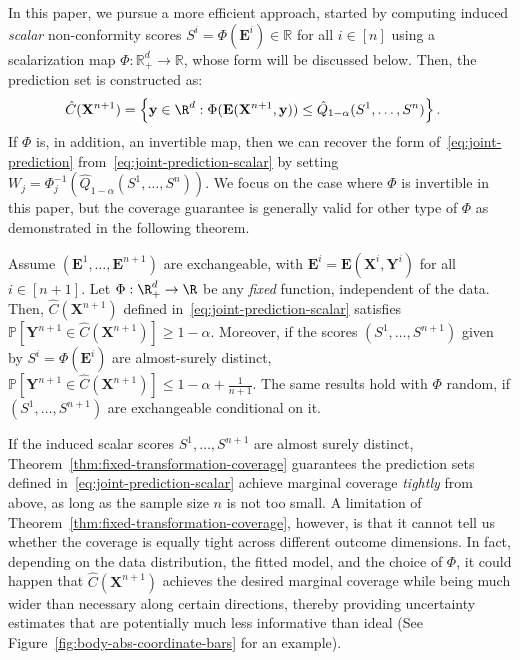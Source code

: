 {\color{blue}In this paper, we pursue a more efficient approach, started by computing induced {\em scalar} non-conformity scores $S^i = \Phi(\mathbf{E}^i) \in \mathbb{R}$ for all $i \in [n]$ using a scalarization map $\Phi : \mathbb{R}^d_+ \to \mathbb{R}$, whose form will be discussed below.
Then, the prediction set is constructed as:
\begin{equation}
    \begin{aligned}
        \hat{C}(\mathbf{X}^{n+1}) &= \left\{\mathbf y \in \R^d: \Phi(\mathbf E(\mathbf{X}^{n+1},\mathbf y)) \leq \hat{Q}_{1-\alpha}(S^1,\ldots,S^n) \right\}.
    \end{aligned}
    \label{eq:joint-prediction-scalar}
\end{equation}
If $\Phi$ is, in addition, an invertible map, then we can recover the form of~\eqref{eq:joint-prediction} from~\eqref{eq:joint-prediction-scalar} by setting $W_j = \Phi^{-1}_j\left(\hat{Q}_{1-\alpha}(S^1,\ldots,S^n)\right)$. We focus on the case where $\Phi$ is invertible in this paper, but the coverage guarantee is generally valid for other type of $\Phi$ as demonstrated in the following theorem.

\begin{theorem} \label{thm:fixed-transformation-coverage}
Assume $(\mathbf{E}^1,\ldots,\mathbf{E}^{n+1})$ are exchangeable, with $\mathbf{E}^i = \mathbf E(\mathbf X^i, \mathbf Y^i)$ for all $i \in [n+1]$.
Let $\Phi:\R^d_+ \to \R$ be any \emph{fixed} function, independent of the data.
Then, $\hat{C}(\mathbf{X}^{n+1})$ defined in~\eqref{eq:joint-prediction-scalar} satisfies $\mathbb{P}[ \mathbf{Y}^{n+1} \in \hat{C}(\mathbf{X}^{n+1}) ] \ge 1 - \alpha$.
Moreover, if the scores $(S^1,\ldots,S^{n+1})$ given by $S^i = \Phi(\mathbf{E}^i)$ are almost-surely distinct, $\mathbb{P}[ \mathbf{Y}^{n+1} \in \hat{C}(\mathbf{X}^{n+1}) ] \leq 1 - \alpha + \frac{1}{n+1}$.
The same results hold with $\Phi$ random, if $(S^1,\ldots,S^{n+1})$ are exchangeable conditional on it.
\end{theorem}

If the induced scalar scores $S^1,\ldots,S^{n+1}$ are almost surely
distinct, Theorem~\ref{thm:fixed-transformation-coverage} guarantees the prediction sets defined in~\eqref{eq:joint-prediction-scalar} achieve marginal coverage {\em tightly} from above, as long as the sample size $n$ is not too small.
A limitation of Theorem~\ref{thm:fixed-transformation-coverage}, however, is that it cannot tell us whether the coverage is equally tight across different outcome dimensions.
In fact, depending on the data distribution, the fitted model, and the choice of $\Phi$, it could happen that $\hat{C}(\mathbf{X}^{n+1})$ achieves the desired marginal coverage while being much wider than necessary along certain directions, thereby providing uncertainty estimates that are potentially much less informative than ideal (See Figure~\ref{fig:body-abs-coordinate-bars} for an example).
}


